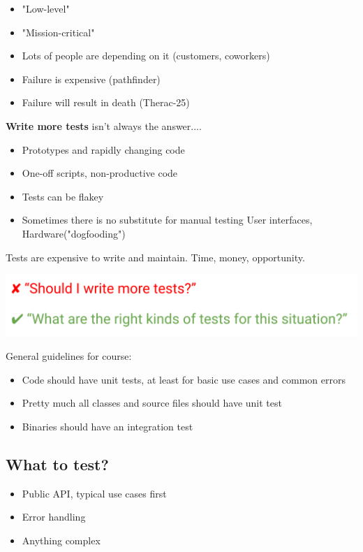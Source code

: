 \documentclass{article}
\begin{document}
\begin{itemize}
    \item "Low-level"
    \item "Mission-critical"
    \item Lots of people are depending on it (customers, coworkers)
    \item Failure is expensive (pathfinder)
    \item Failure will result in death (Therac-25)
\end{itemize}

\textbf{Write more tests} isn't always the answer....

\begin{itemize}
    \item Prototypes and rapidly changing code 
    \item One-off scripts, non-productive code
    \item Tests can be flakey 
    \item Sometimes there is no substitute for manual testing
    User interfaces, Hardware("dogfooding")
\end{itemize}

Tests are expensive to write and maintain. Time, money, opportunity.

\includegraphics*[width=0.6\linewidth]{testChecklist.png}

General guidelines for course:
\begin{itemize}
    \item Code should have unit tests, at least for basic use cases and common errors
    \item Pretty much all classes and source files should have unit test
    \item Binaries should have an integration test 
\end{itemize}

\subsection{What to test?}

\begin{itemize}
    \item Public API, typical use cases first
    \item Error handling
    \item Anything complex 
\end{itemize}
\end{document}
